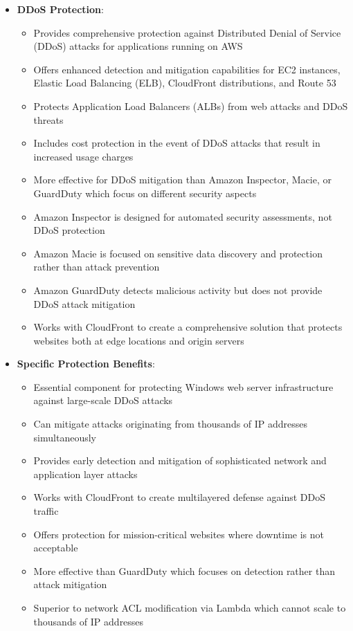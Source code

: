\documentclass[11pt,a4paper]{report}
\begin{document}
\begin{itemize}
\begin{itemize}
\end{itemize}
  \item \textbf{DDoS Protection}:
\begin{itemize}
  \item Provides comprehensive protection against Distributed Denial of Service (DDoS) attacks for applications running on AWS
  \item Offers enhanced detection and mitigation capabilities for EC2 instances, Elastic Load Balancing (ELB), CloudFront distributions, and Route 53
  \item Protects Application Load Balancers (ALBs) from web attacks and DDoS threats
  \item Includes cost protection in the event of DDoS attacks that result in increased usage charges
  \item More effective for DDoS mitigation than Amazon Inspector, Macie, or GuardDuty which focus on different security aspects
  \item Amazon Inspector is designed for automated security assessments, not DDoS protection
  \item Amazon Macie is focused on sensitive data discovery and protection rather than attack prevention
  \item Amazon GuardDuty detects malicious activity but does not provide DDoS attack mitigation
  \item Works with CloudFront to create a comprehensive solution that protects websites both at edge locations and origin servers
\end{itemize}
  \item \textbf{Specific Protection Benefits}:
\begin{itemize}
  \item Essential component for protecting Windows web server infrastructure against large-scale DDoS attacks
  \item Can mitigate attacks originating from thousands of IP addresses simultaneously
  \item Provides early detection and mitigation of sophisticated network and application layer attacks
  \item Works with CloudFront to create multilayered defense against DDoS traffic
  \item Offers protection for mission-critical websites where downtime is not acceptable
  \item More effective than GuardDuty which focuses on detection rather than attack mitigation
  \item Superior to network ACL modification via Lambda which cannot scale to thousands of IP addresses

\end{itemize}
\end{itemize}
\end{document}
